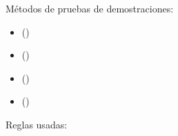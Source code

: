 %
\begin{isabellebody}%
%
%
\isadelimtheory
\isanewline
%
\endisadelimtheory
%
\isatagtheory
%
\endisatagtheory
{\isafoldtheory}%
%
\isadelimtheory
%
\endisadelimtheory
%
\begin{isamarkuptext}%
Métodos de pruebas de demostraciones:

 \begin{itemize}
  \item[]  \hfill ()
  \end{itemize}

 \begin{itemize}
  \item[]  \hfill ()
  \end{itemize}

 \begin{itemize}
  \item[]  \hfill ()
  \end{itemize}

 \begin{itemize}
  \item[]  \hfill ()
  \end{itemize}


Reglas usadas:


\end{isamarkuptext}
\end{isabellebody}
